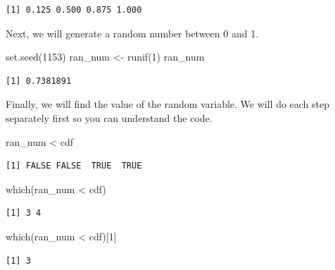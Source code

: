 \documentclass[
  letterpaper,
  DIV=11,
  numbers=noendperiod]{scrreprt}
\newenvironment{Shaded}{\begin{snugshade}}{\end{snugshade}}
\newcommand{\DecValTok}[1]{\textcolor[rgb]{0.68,0.00,0.00}{#1}}
\newcommand{\FunctionTok}[1]{\textcolor[rgb]{0.28,0.35,0.67}{#1}}
\newcommand{\NormalTok}[1]{\textcolor[rgb]{0.00,0.23,0.31}{#1}}
\newcommand{\OtherTok}[1]{\textcolor[rgb]{0.00,0.23,0.31}{#1}}
\newcommand{\SpecialCharTok}[1]{\textcolor[rgb]{0.37,0.37,0.37}{#1}}
\begin{document}
\begin{verbatim}
[1] 0.125 0.500 0.875 1.000
\end{verbatim}

Next, we will generate a random number between 0 and 1.

\begin{Shaded}
\begin{Highlighting}[]
\FunctionTok{set.seed}\NormalTok{(}\DecValTok{1153}\NormalTok{)}
\NormalTok{ran\_num }\OtherTok{\textless{}{-}} \FunctionTok{runif}\NormalTok{(}\DecValTok{1}\NormalTok{)}
\NormalTok{ran\_num}
\end{Highlighting}
\end{Shaded}

\begin{verbatim}
[1] 0.7381891
\end{verbatim}

Finally, we will find the value of the random variable. We will do each
step separately first so you can understand the code.

\begin{Shaded}
\begin{Highlighting}[]
\NormalTok{ran\_num }\SpecialCharTok{\textless{}}\NormalTok{ cdf}
\end{Highlighting}
\end{Shaded}

\begin{verbatim}
[1] FALSE FALSE  TRUE  TRUE
\end{verbatim}

\begin{Shaded}
\begin{Highlighting}[]
\FunctionTok{which}\NormalTok{(ran\_num }\SpecialCharTok{\textless{}}\NormalTok{ cdf)}
\end{Highlighting}
\end{Shaded}

\begin{verbatim}
[1] 3 4
\end{verbatim}

\begin{Shaded}
\begin{Highlighting}[]
\FunctionTok{which}\NormalTok{(ran\_num }\SpecialCharTok{\textless{}}\NormalTok{ cdf)[}\DecValTok{1}\NormalTok{]}
\end{Highlighting}
\end{Shaded}

\begin{verbatim}
[1] 3
\end{verbatim}
\end{document}
